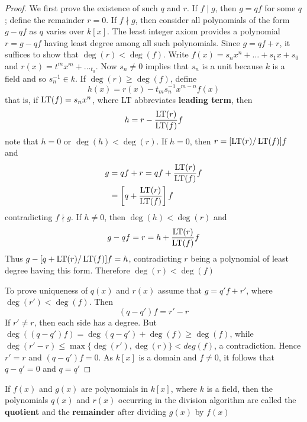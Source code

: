 \documentclass[11pt]{article}
\begin{document}
\begin{proof}
We first prove the existence of such \(q\) and \(r\). If \(f\mid g\), then
\(g=qf\) for some \(q\); define the remainder \(r=0\). If \(f\nmid g\), then
consider all polynomials of the form \(g-qf\) as \(q\) varies over \(k[x]\). The
least integer axiom provides a polynomial \(r=g-qf\) having least degree
among all such polynomials. Since \(g=qf+r\), it suffices to show that
\(\deg(r)<\deg(f)\). Write \(f(x)=s_nx^n+\dots+s_1x+s_0\) and
\(r(x)=t^mx^m+\dots_t_0\). Now \(s_n\neq 0\) implies that \(s_n\) is a unit
because \(k\) is a field and so \(s_n^{-1}\in k\). If \(\deg(r)\ge\deg(f)\), define
\begin{equation*}
h(x)=r(x)-t_ms_n^{-1}x^{m-n}f(x)
\end{equation*}
that is, if \(\operatorname{LT}(f)=s_nx^n\), where LT abbreviates \textbf{leading term}, then
\begin{equation*}
h=r-\frac{\operatorname{LT}(r)}{\operatorname{LT}(f)}f
\end{equation*}
note that \(h=0\) or \(\deg(h)<\deg(r)\). If \(h=0\), then \(r=[\operatorname{LT}(r)/\operatorname{LT}(f)]f\)
and
\begin{align*}
g&=qf+r=qf+\frac{\operatorname{LT}(r)}{\operatorname{LT}(f)}f\\
&=\left[q+\frac{\operatorname{LT}(r)}{\operatorname{LT}(f)}\right]f
\end{align*}
contradicting \(f\nmid g\). If \(h\neq0\), then \(\deg(h)<\deg(r)\) and
\begin{equation*}
g-qf=r=h+\frac{\operatorname{LT}(r)}{\operatorname{LT}(f)}f
\end{equation*}
Thus \(g-[q+\operatorname{LT}(r)/\operatorname{LT}(f)]f=h\), contradicting \(r\) being a polynomial of least
degree having this form. Therefore \(\deg(r)<\deg(f)\)

To prove uniqueness of \(q(x)\) and \(r(x)\) assume that \(g=q'f+r'\), where
\(\deg(r')<\deg(f)\). Then
\begin{equation*}
(q-q')f=r'-r
\end{equation*}
If \(r'\neq r\), then each side has a degree. But
\(\deg((q-q')f)=\deg(q-q')+\deg(f)\ge\deg(f)\), while
\(\deg(r'-r)\le\max\{\deg(r'),\deg(r)\}<deg(f)\), a contradiction. Hence
\(r'=r\) and \((q-q')f=0\). As \(k[x]\) is a domain and \(f\neq 0\), it follows that
\(q-q'=0\) and \(q=q'\)
\end{proof}

\begin{definition}[]
If \(f(x)\) and \(g(x)\) are polynomials in \(k[x]\), where \(k\) is a field, then
the polynomials \(q(x)\) and \(r(x)\) occurring in the division algorithm are
called the \textbf{quotient} and the \textbf{remainder} after dividing \(g(x)\) by \(f(x)\)
\end{definition}
\end{document}

